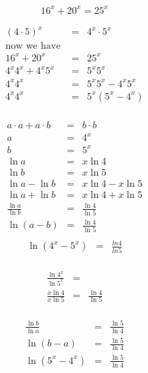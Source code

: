 \documentclass{article}
\begin{document}
\fi

\begin{QAP}
  \begin{KQ}
    \begin{equation*}
      16^x + 20^x = 25^x 
    \end{equation*}
  \end{KQ}
  \begin{KA}

    \begin{eqnarray*}
      ( 4 \cdot 5 )^x & = &  4^x \cdot 5^x  \\
      \text{now we have  } \\
      16^x + 20^x &=& 25^x \\
      4^x4^x + 4^x5^x &= &5^x5^x \\ 
      4^x4^x &=& 5^x5^x - 4^x5^x \\
      4^x4^x &=& 5^x ( 5^x - 4^x) \\
    \end{eqnarray*}


    \begin{eqnarray*}
      a\cdot a + a \cdot b &= &b \cdot b\\
      a & = & 4^x \\
      b & = & 5^x \\
      \ln a & = & x \ln 4 \\
      \ln b & = & x \ln 5 \\
      \ln a - \ln b & = & x \ln 4 - x \ln 5 \\
      \ln a + \ln b & = & x \ln 4 + x \ln 5 \\
      \frac{\ln a}{\ln b } & = & \frac{\ln 4}{\ln 5} \\
      \ln \left(a - b \right)  & = & \frac{\ln 4}{\ln 5} \\
    \end{eqnarray*}
    \begin{eqnarray*}
      \ln ( 4^x - 5^x ) & = & \frac{ln 4}{ln 5} \\
    \end{eqnarray*}

    \begin{eqnarray*}
      \frac{\ln 4^x}{\ln 5^x} & = & \\
      \frac{ x \ln 4 }{ x \ln 5 } & = & \frac{\ln 4}{\ln 5} \\
    \end{eqnarray*}


    \begin{eqnarray*}
      \frac{\ln b}{\ln a } & = & \frac{\ln 5}{\ln 4} \\
      \ln (b - a)& = & \frac{\ln 5}{\ln 4} \\
      \ln (5^x - 4^x) & = & \frac{\ln 5}{\ln 4} \\
    \end{eqnarray*}



\end{KA}
\end{QAP}
\end{document}
